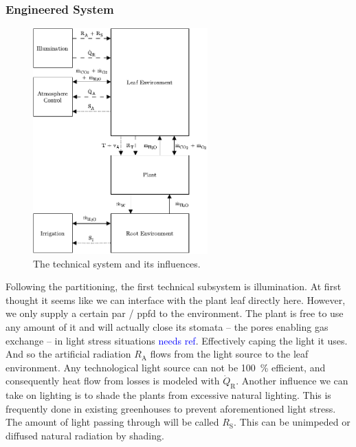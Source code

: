 \subsubsection{Engineered System}
\label{subsub:engineered-system}
\begin{figure}
	\includegraphics[width=0.6\textwidth]{img/system_analysis/engineered-system.pdf}
	\caption{The technical system and its influences.}
	\label{wfig:engineered-system}
\end{figure} 

Following the partitioning, the first technical subsystem is illumination.
At first thought it seems like we can interface with the plant leaf directly here.
However, we only supply a certain \ac{par} / \ac{ppfd} to the environment.
The plant is free to use any amount of it and will actually close its stomata -- the pores enabling gas exchange -- in light stress situations \textcolor{Blue}{needs ref}.
Effectively caping the light it uses.
And so the artificial radiation $R_\text{A}$ flows from the light source to the leaf environment.
Any technological light source can not be \SI{100}{\percent} efficient, and consequently heat flow from losses is modeled with $\dot{Q}_\text{R}$.
Another influence we can take on lighting is to shade the plants from excessive natural lighting.
This is frequently done in existing greenhouses to prevent aforementioned light stress.
The amount of light passing through will be called $R_\text{S}$.
This can be unimpeded or diffused natural radiation by shading.

